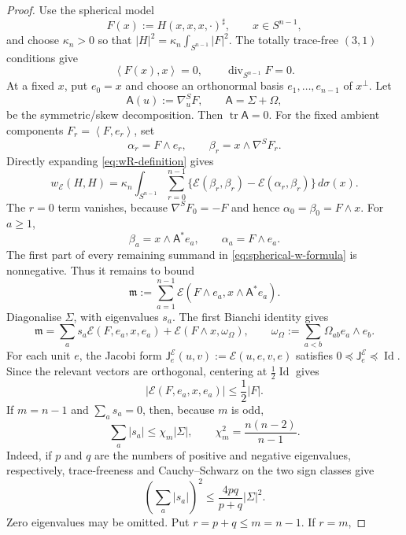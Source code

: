 \documentclass[reqno,11pt]{amsart}
\theoremstyle{definition}
\newcommand{\cE}{\mathcal E}
\newcommand{\tr}{\operatorname{tr}}
\newcommand{\Id}{\operatorname{Id}}
\newcommand{\inner}[2]{\left\langle #1,#2\right\rangle}
\begin{document}
\begin{proof}
Use the spherical model
$$
  F(x):=H(x,x,x,\cdot)^\sharp,
  \qquad x\in S^{n-1},
$$
and choose $\kappa_n>0$ so that
$|H|^2=\kappa_n\int_{S^{n-1}}|F|^2$.  The totally trace-free $(3,1)$ conditions give
\begin{equation}\label{eq:pure-spherical-conditions}
  \inner{F(x)}x=0,
  \qquad \operatorname{div}_{S^{n-1}}F=0.
\end{equation}
At a fixed $x$, put $e_0=x$ and choose an orthonormal basis
$e_1,\ldots,e_{n-1}$ of $x^\perp$.  Let
$$
  \mathsf A(u):=\nabla^S_uF,
  \qquad \mathsf A=\Sigma+\Omega,
$$
be the symmetric/skew decomposition. Then $\tr\mathsf A=0$.  For the fixed
ambient components $F_r=\inner F{e_r}$, set
$$
  \alpha_r=F\wedge e_r,
  \qquad \beta_r=x\wedge\nabla^SF_r.
$$
Directly expanding \eqref{eq:wR-definition} gives
\begin{equation}\label{eq:spherical-w-formula}
 w_{\cE}(H,H)=\kappa_n\int_{S^{n-1}}
 \sum_{r=0}^{n-1}
 \{\cE(\beta_r,\beta_r)-\cE(\alpha_r,\beta_r)\}\,d\sigma(x).
\end{equation}
The $r=0$ term vanishes, because
$\nabla^SF_0=-F$ and hence $\alpha_0=\beta_0=F\wedge x$.  For $a\geq1$,
$$
 \beta_a=x\wedge\mathsf A^*e_a,
 \qquad \alpha_a=F\wedge e_a.
$$
The first part of every remaining summand in
\eqref{eq:spherical-w-formula} is nonnegative.  Thus it remains to bound
$$
 \mathfrak m:=\sum_{a=1}^{n-1}\cE(F\wedge e_a,x\wedge\mathsf A^*e_a).
$$
Diagonalise $\Sigma$, with eigenvalues $s_a$.  The first Bianchi identity gives
\begin{equation}\label{eq:M-decomposition}
 \mathfrak m=\sum_a s_a\cE(F,e_a,x,e_a)
   +\cE(F\wedge x,\omega_\Omega),
 \qquad
 \omega_\Omega:=\sum_{a<b}\Omega_{ab}e_a\wedge e_b.
\end{equation}
For each unit $e$, the Jacobi form
$\mathsf J_e^{\cE}(u,v):=\cE(u,e,v,e)$ satisfies
$0\preceq\mathsf J_e^{\cE}\preceq\Id$.  Since the
relevant vectors are orthogonal, centering at $\frac12\Id$ gives
$$
  |\cE(F,e_a,x,e_a)|\leq\frac12|F|.
$$
If $m=n-1$ and $\sum_as_a=0$, then, because $m$ is odd,
\begin{equation}\label{eq:tracefree-l1}
  \sum_a|s_a|\leq\chi_m|\Sigma|,
  \qquad \chi_m^2=\frac{n(n-2)}{n-1}.
\end{equation}
Indeed, if $p$ and $q$ are the numbers of positive and negative eigenvalues,
respectively, trace-freeness and Cauchy--Schwarz on the two sign classes give
$$
 \left(\sum_a|s_a|\right)^2
 \leq\frac{4pq}{p+q}|\Sigma|^2.
$$
Zero eigenvalues may be omitted.  Put $r=p+q\leq m=n-1$.  If $r=m$,

\end{proof}
\end{document}
